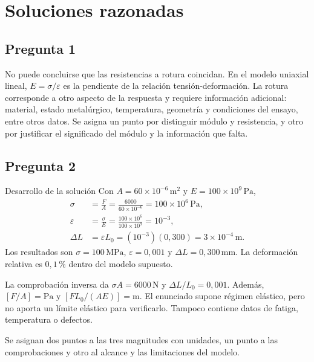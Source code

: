 
\chapter{Soluciones razonadas}
\section{Pregunta 1}
No puede concluirse que las resistencias a rotura coincidan. En el modelo uniaxial lineal, $E=\sigma/\varepsilon$ es la pendiente de la relación tensión-deformación. La rotura corresponde a otro aspecto de la respuesta y requiere información adicional: material, estado metalúrgico, temperatura, geometría y condiciones del ensayo, entre otros datos. Se asigna un punto por distinguir módulo y resistencia, y otro por justificar el significado del módulo y la información que falta.

\section{Pregunta 2}
\begin{studiumworked}{Desarrollo de la solución}
Con $A=60\times10^{-6}\,\mathrm{m^2}$ y $E=100\times10^9\,\mathrm{Pa}$,
\begin{align*}
\sigma&=\frac{F}{A}=\frac{6000}{60\times10^{-6}}=100\times10^6\,\mathrm{Pa},\\
\varepsilon&=\frac{\sigma}{E}=\frac{100\times10^6}{100\times10^9}=10^{-3},\\
\Delta L&=\varepsilon L_0=(10^{-3})(0{,}300)=3\times10^{-4}\,\mathrm{m}.
\end{align*}
Los resultados son $\sigma=100\,\mathrm{MPa}$, $\varepsilon=0{,}001$ y $\Delta L=0{,}300\,\mathrm{mm}$. La deformación relativa es $0{,}1\,\%$ dentro del modelo supuesto.
\end{studiumworked}

La comprobación inversa da $\sigma A=6000\,\mathrm{N}$ y $\Delta L/L_0=0{,}001$. Además, $[F/A]=\mathrm{Pa}$ y $[FL_0/(AE)]=\mathrm{m}$. El enunciado supone régimen elástico, pero no aporta un límite elástico para verificarlo. Tampoco contiene datos de fatiga, temperatura o defectos.

Se asignan dos puntos a las tres magnitudes con unidades, un punto a las comprobaciones y otro al alcance y las limitaciones del modelo.

